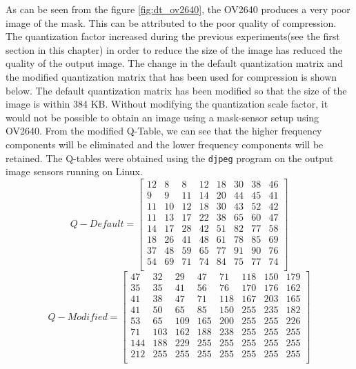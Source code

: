 As can be seen from the figure \ref{fig:dt_ov2640}, the OV2640 produces a very poor image of the mask. This can be attributed to the poor quality of compression. The quantization factor increased during the previous experiments(see the first section in this chapter) in order to reduce the size of the image has reduced the quality of the output image. The change in the default quantization matrix and the modified quantization matrix that has been used for compression is shown below. The default quantization matrix has been modified so that the size of the image is within 384 KB. Without modifying the quantization scale factor, it would not be possible to obtain an image using a mask-sensor setup using OV2640. From the modified Q-Table, we can see that the higher frequency components will be eliminated and the lower frequency components will be retained. The Q-tables were obtained using the \texttt{djpeg} program\cite{djpeg} on the output image sensors running on Linux. 
\[
Q-Default = 
\begin{bmatrix}
          12  &  8 &   8  & 12 &  18 &  30 &  38&   46 \\
           9   & 9  & 11  & 14  & 20  & 44   &45  & 41 \\
          11  & 10 &  12  & 18 &  30 &  43 &  52 &  42 \\
          11  & 13  & 17   &22  & 38  & 65  & 60  & 47 \\
          14  & 17  & 28  & 42  & 51 &  82 &  77 &  58 \\
          18  & 26  & 41  & 48 &  61  & 78 &  85  & 69 \\
          37  & 48 &  59 &  65 &  77 &  91 &  90 &  76 \\
          54  & 69  & 71  & 74  & 84  & 75  & 77  & 74 \\
\end{bmatrix}
\]
\[
Q-Modified = 
\begin{bmatrix}
        47 &  32 &  29 &  47 &  71 & 118 & 150 & 179 \\
          35 &  35 &  41 &  56 &  76 & 170 & 176 & 162\\
          41 &  38 &  47  & 71 & 118 & 167 & 203 & 165\\
          41 &  50 &  65  & 85 & 150 & 255 & 235 & 182\\
          53 &  65 & 109 & 165 & 200 & 255 & 255 & 226\\
          71 & 103 & 162 & 188 & 238 & 255 & 255 & 255\\
         144 & 188 & 229 & 255 & 255 & 255 & 255 & 255\\
         212 & 255 & 255 & 255 & 255 & 255 & 255 & 255\\
\end{bmatrix}
\]

